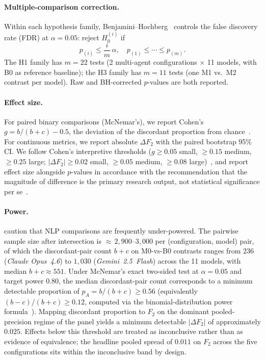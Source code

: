 \paragraph{Multiple-comparison correction.}
Within each hypothesis family, Benjamini--Hochberg~\cite{benjamini1995controlling}
controls the false discovery rate (FDR) at $\alpha{=}0.05$: reject $H_0^{(i)}$ if
%
\begin{equation}\label{eq:bh}
  p_{(i)} \leq \frac{i}{m}\,\alpha,
  \quad p_{(1)} \leq \cdots \leq p_{(m)}.
\end{equation}
%
The H1 family has $m{=}22$ tests (2 multi-agent configurations
$\times$ 11 models, with B0 as reference baseline); the H3 family has
$m{=}11$ tests (one M1 vs.\ M2 contrast per model). Raw and BH-corrected $p$-values
are both reported.

\paragraph{Effect size.}
For paired binary comparisons (McNemar's), we report Cohen's
$g = b/(b{+}c) - 0.5$, the deviation of the discordant proportion from
chance~\cite{cohen1988statistical}. For continuous metrics, we report absolute
$\Delta F_2$ with the paired bootstrap 95\% CI\@. We follow Cohen's interpretive
thresholds ($g \geq 0.05$ small, $\geq 0.15$ medium, $\geq 0.25$ large;
$|\Delta F_2| \geq 0.02$ small, $\geq 0.05$ medium, $\geq 0.08$
large)~\cite{cohen1988statistical}, and report effect size alongside $p$-values in
accordance with the recommendation that the magnitude of difference is the primary
research output, not statistical significance per se~\cite{sullivan2012effect}.

\paragraph{Power.}
\textcite{card2020little} caution that NLP comparisons are frequently
under-powered. The pairwise sample size after intersection is
${\approx}\,2{,}900$--$3{,}000$ per (configuration, model) pair, of which
the discordant-pair count $b{+}c$ on M0-vs-B0 contrasts ranges from $236$
(\textit{Claude Opus~4.6}) to $1{,}030$ (\textit{Gemini~2.5~Flash}) across
the 11 models, with median $b{+}c \approx 551$. Under McNemar's exact two-sided
test at $\alpha{=}0.05$ and target power $0.80$, the median discordant-pair
count corresponds to a minimum detectable proportion of
$p_A = b/(b{+}c) \geq 0.56$ (equivalently $(b{-}c)/(b{+}c) \geq 0.12$, computed
via the binomial-distribution power formula~\cite{connor1987sample}). Mapping
discordant proportion to $F_2$ on the dominant pooled-precision regime of the
panel yields a minimum detectable $|\Delta F_2|$ of approximately $0.025$.
Effects below this threshold are treated as inconclusive rather than as
evidence of equivalence; the headline pooled spread of $0.011$ on $F_2$
across the five configurations sits within the inconclusive band by design.

